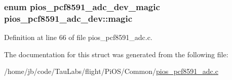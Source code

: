 \hypertarget{structpios__pcf8591__adc__dev_ae9e3e9fe7b242736640f5e5c5846efe3}{
\subsubsection[{magic}]{\setlength{\rightskip}{0pt plus 5cm}enum {\bf pios\-\_\-pcf8591\-\_\-adc\-\_\-dev\-\_\-magic} {\bf pios\-\_\-pcf8591\-\_\-adc\-\_\-dev\-::magic}}}\label{structpios__pcf8591__adc__dev_ae9e3e9fe7b242736640f5e5c5846efe3}


\-Definition at line 66 of file pios\-\_\-pcf8591\-\_\-adc.\-c.



\-The documentation for this struct was generated from the following file\-:\begin{DoxyCompactItemize}
\item 
/home/jb/code/\-Tau\-Labs/flight/\-Pi\-O\-S/\-Common/\hyperlink{pios__pcf8591__adc_8c}{pios\-\_\-pcf8591\-\_\-adc.\-c}\end{DoxyCompactItemize}
